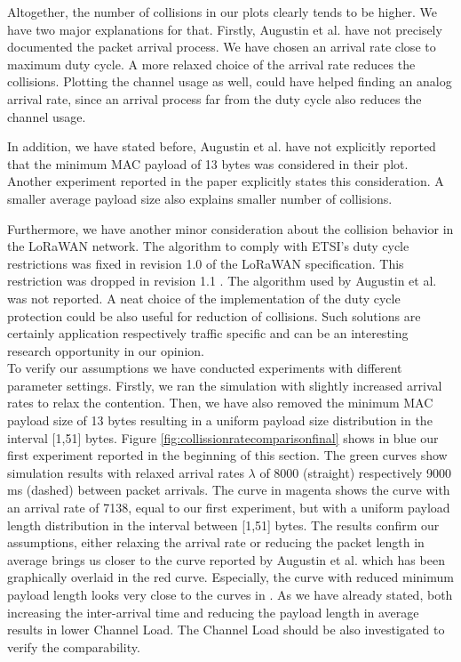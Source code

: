 \documentclass{article}
\begin{document}
Altogether, the number of collisions in our plots clearly tends to be higher.
We have two major explanations for that. Firstly, Augustin et al. have not
precisely documented the packet arrival process. We have chosen an arrival rate
close to maximum duty cycle. A more relaxed choice of the arrival rate reduces
the collisions. Plotting the channel usage as well, could have helped finding
an analog arrival rate, since an arrival process far from the duty cycle also
reduces the channel usage.

In addition, we have stated before, Augustin et al. have not explicitly
reported that the minimum MAC payload of 13 bytes was considered in their plot.
Another experiment reported in the paper explicitly states this consideration.
A smaller average payload size also explains smaller number of collisions.

Furthermore, we have another minor consideration about the collision behavior
in the LoRaWAN network. The algorithm to comply with ETSI's duty cycle
restrictions was fixed in revision 1.0 of the LoRaWAN specification. This
restriction was dropped in revision 1.1 \cite{lorawanspec}.  The algorithm used
by Augustin et al. was not reported. A neat choice of the implementation of the
duty cycle protection could be also useful for reduction of collisions. Such
solutions are certainly application respectively traffic specific and can be an
interesting research opportunity in our opinion.\\

To verify our assumptions we have conducted experiments with different
parameter settings. Firstly, we ran the simulation with slightly increased
arrival rates to relax the contention. Then, we have also removed the minimum
MAC payload size of 13 bytes resulting in a uniform payload size distribution
in the interval [1,51] bytes. Figure \ref{fig:collissionratecomparisonfinal}
shows in blue our first experiment reported in the beginning of this section.
The green curves show simulation results with relaxed arrival rates $\lambda$
of 8000 (straight) respectively 9000 ms (dashed) between packet arrivals. The
curve in magenta shows the curve with an arrival rate of 7138, equal to our
first experiment, but with a uniform payload length distribution in the
interval between [1,51] bytes. The results confirm our assumptions, either
relaxing the arrival rate or reducing the packet length in average brings us
closer to the curve reported by Augustin et al. which has been graphically
overlaid in the red curve. Especially, the curve with reduced minimum payload
length looks very close to the curves in \cite{augustin2016study}. As we have
already stated, both increasing the inter-arrival time and reducing the payload
length in average results in lower Channel Load. The Channel Load should be
also investigated to verify the comparability. 
\end{document}
